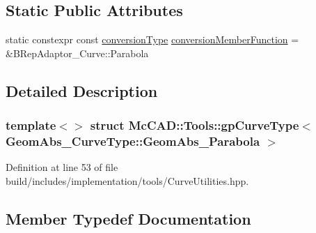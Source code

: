\subsection*{Static Public Attributes}
\begin{DoxyCompactItemize}
\item 
static constexpr const \hyperlink{structMcCAD_1_1Tools_1_1gpCurveType_3_01GeomAbs__CurveType_1_1GeomAbs__Parabola_01_4_a39895972416d7cbcd11ba78c5dd3d745}{conversion\+Type} \hyperlink{structMcCAD_1_1Tools_1_1gpCurveType_3_01GeomAbs__CurveType_1_1GeomAbs__Parabola_01_4_abda59552caac58297eb8add53cc29bdd}{conversion\+Member\+Function} = \&B\+Rep\+Adaptor\+\_\+\+Curve\+::\+Parabola
\end{DoxyCompactItemize}


\subsection{Detailed Description}
\subsubsection*{template$<$$>$\newline
struct Mc\+C\+A\+D\+::\+Tools\+::gp\+Curve\+Type$<$ Geom\+Abs\+\_\+\+Curve\+Type\+::\+Geom\+Abs\+\_\+\+Parabola $>$}



Definition at line 53 of file build/includes/implementation/tools/\+Curve\+Utilities.\+hpp.



\subsection{Member Typedef Documentation}
\mbox{\label{structMcCAD_1_1Tools_1_1gpCurveType_3_01GeomAbs__CurveType_1_1GeomAbs__Parabola_01_4_a39895972416d7cbcd11ba78c5dd3d745}} 
